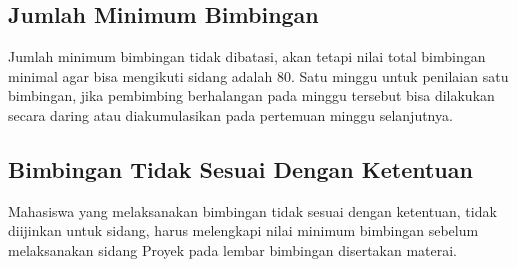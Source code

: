 \subsection{Jumlah Minimum Bimbingan}
Jumlah	 minimum	 bimbingan	 tidak	 dibatasi,	 akan	 tetapi	 nilai	 total	 bimbingan	 minimal agar	bisa	mengikuti	sidang	adalah	80.	Satu	minggu	untuk	penilaian	satu bimbingan,	jika pembimbing	 berhalangan	 pada	 minggu	 tersebut	 bisa	 dilakukan	 secara	 daring	 atau diakumulasikan	pada	pertemuan	minggu	selanjutnya.

\subsection{Bimbingan Tidak Sesuai Dengan Ketentuan}
Mahasiswa	 yang	 melaksanakan	 bimbingan	 tidak	 sesuai	 dengan	 ketentuan,	 tidak diijinkan	 untuk	 sidang,	 harus	 melengkapi	 nilai minimum	 bimbingan	 sebelum melaksanakan	sidang Proyek pada	lembar	bimbingan	disertakan	materai.